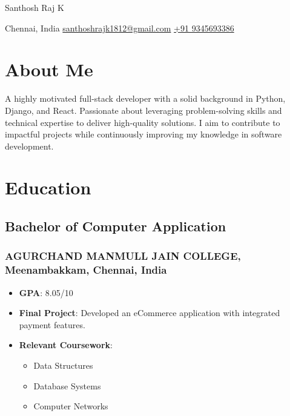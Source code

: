 \documentclass[11pt]{article}
\begin{document}
\begin{center}      
    {\fontsize{30}{30}\selectfont Santhosh Raj K} \\ \bigskip

    {\color{icnclr}\faMapMarker} Chennai, India \quad 
    {\color{icnclr}\faEnvelope[regular]} \href{mailto:santhoshrajk1812@gmail.com}{santhoshrajk1812@gmail.com} \quad
    {\color{icnclr}\Mobilefone} \href{tel:+91 9345693386}{+91 9345693386} 
\end{center}

\section{About Me}
A highly motivated full-stack developer with a solid background in Python, Django, and React. Passionate about leveraging problem-solving skills and technical expertise to deliver high-quality solutions. I aim to contribute to impactful projects while continuously improving my knowledge in software development.

\section{Education}
\subsection{Bachelor of Computer Application \hfill {}}  
\subsubsection{AGURCHAND MANMULL JAIN COLLEGE, Meenambakkam, Chennai, India}
\begin{itemize}
    \item \textbf{GPA}: 8.05/10
    \item \textbf{Final Project}: Developed an eCommerce application with integrated payment features.
    \item \textbf{Relevant Coursework}: 
    \begin{itemize}
        \item Data Structures
        \item Database Systems
        \item Computer Networks
    \end{itemize}
\end{itemize}
\end{document}

